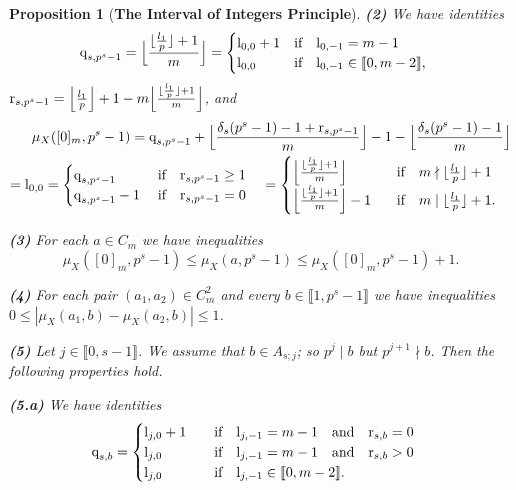 \documentclass[11pt]{amsart}
\newtheorem{proposition}[theorem]{Proposition}
\def\l{\textup{l}}
\def\r{\textup{r}}
\def\q{\textup{q}}
\begin{document}
\begin{proposition}[{\bf The Interval of Integers Principle}]
{\bf (2)} We have identities 
\begin{equation*}
\q_{s,p^s-1}=\Big\lfloor\frac{\lfloor \frac{l_1}{p}\rfloor+1}{m}\Big\rfloor=\begin{cases}\l_{0,0}+1\quad\textup{if}\quad\l_{0,-1}=m-1\\
\l_{0,0}\quad\quad\;\;\,\textup{if}\quad \l_{0,-1}\in\llbracket0,m-2\rrbracket,\end{cases}
\end{equation*} 
$\r_{s,p^s-1}=\Big\lfloor \frac{l_1}{p}\Big\rfloor+1-m\Big\lfloor\frac{\lfloor \frac{l_1}{p}\rfloor+1}{m}\Big\rfloor$, and
\begin{equation}\label{EQ59}
\begin{split}\mu_X([0]_m,p^s-1)=\q_{s,p^s-1}+\Big\lfloor\frac{\delta_s(p^s-1)-1+\r_{s,p^s-1}}{m}\Big\rfloor-1-\Big\lfloor\frac{\delta_s(p^s-1)-1}{m}\Big\rfloor\\
=\l_{0,0}=\begin{cases}\q_{s,p^s-1}\quad\quad\quad\textup{if}\quad \r_{s,p^s-1}\ge 1\\
\q_{s,p^s-1}-1\quad\;\textup{if}\quad \r_{s,p^s-1}=0\end{cases}=\begin{cases}\Big\lfloor\frac{\lfloor \frac{l_1}{p}\rfloor+1}{m}\Big\rfloor\quad\quad\quad\;\;\textup{if}\quad m\nmid \lfloor \frac{l_1}{p}\rfloor+1\\
\Big\lfloor\frac{\lfloor \frac{l_1}{p}\rfloor+1}{m}\Big\rfloor-1\quad\;\;\;\textup{if}\quad m\mid\lfloor \frac{l_1}{p}\rfloor+1.\end{cases}
\end{split}
\end{equation}

{\bf (3)} For each $a\in C_m$ we have inequalities 
$$\mu_X([0]_m,p^s-1)\le\mu_X(a,p^s-1)\le \mu_X([0]_m,p^s-1)+1.$$

{\bf (4)} For each pair $(a_1,a_2)\in C_m^2$ and every $b\in\llbracket1,p^s-1\rrbracket$ we have inequalities $0\le |\mu_X(a_1,b)-\mu_X(a_2,b)|\le 1$.

\smallskip
{\bf (5)} Let $j\in\llbracket0,s-1\rrbracket$. We assume that $b\in A_{s;j}$; so $p^j\mid b$ but $p^{j+1}\nmid b$. Then the following properties hold.

\medskip\noindent
{\bf (5.a)} We have identities
$$\q_{s,b}=\begin{cases}\l_{j,0}+1\quad\quad\textup{if}\quad\l_{j,-1}=m-1\quad\textup{and}\quad \r_{s,b}=0\\
\l_{j,0}\quad\quad\quad\;\;\,\textup{if}\quad\l_{j,-1}=m-1\quad\textup{and}\quad \r_{s,b}>0\\
\l_{j,0}\quad\quad\quad\;\;\,\textup{if}\quad \l_{j,-1}\in\llbracket0,m-2\rrbracket.\end{cases}$$


\end{proposition}
\end{document}

